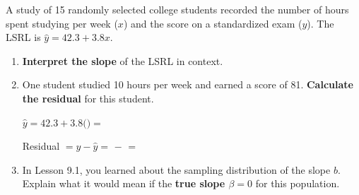 \documentclass[10pt]{article}
\begin{document}
\namedateperiod

\vspace{0.15in}

A study of 15 randomly selected college students recorded the number of hours spent
studying per week ($x$) and the score on a standardized exam ($y$).
The LSRL is $\hat{y} = 42.3 + 3.8x$.

\begin{enumerate}

  \item \textbf{Interpret the slope} of the LSRL in context.


  \item One student studied 10 hours per week and earned a score of 81.
        \textbf{Calculate the residual} for this student.

        \vspace{0.05in}
        $\hat{y} = 42.3 + 3.8($\blank{1.5cm}$) = $ \blank{2.5cm}

        \vspace{0.08in}
        Residual $= y - \hat{y} = $ \blank{2cm} $-$ \blank{2cm} $= $ \blank{2cm}

        \vspace{0.1in}

  \item In Lesson 9.1, you learned about the sampling distribution of the slope $b$.
        Explain what it would mean if the \textbf{true slope $\beta = 0$} for this
        population.


\end{enumerate}
\end{document}
